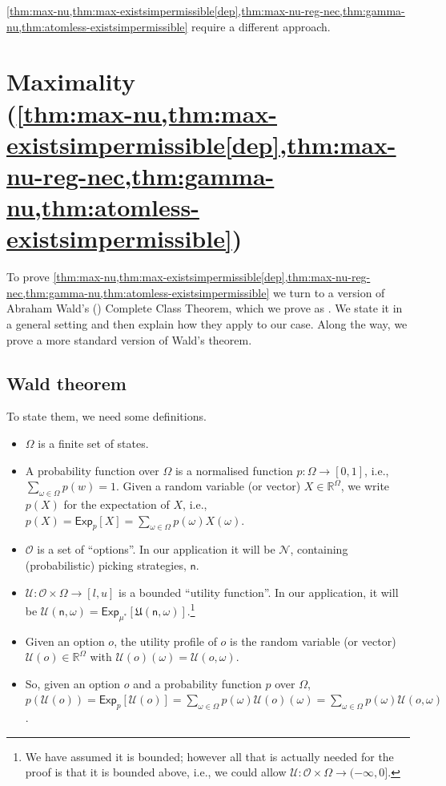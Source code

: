 \documentclass[a4paper,final]{article}
\newcommand\Exp{\mathsf{Exp}}
\renewcommand\O{\mathcal{O}}
\newcommand\U{\mathfrak{U}} %
\newcommand\Uwald{\mathcal{U}} %
\newcommand{\n}{\mathsf{n}}
\newcommand\Nu{\mathcal{N}}
\renewcommand{\Re}{\mathbb{R}}
\newenvironment{CCM rewritten}
{\begingroup\color{blue}} %
{\endgroup}              %
\begin{document}
\cref{thm:max-nu,thm:max-existsimpermissible[dep],thm:max-nu-reg-nec,thm:gamma-nu,thm:atomless-existsimpermissible} require a different approach.


\section{Maximality \\(\cref{thm:max-nu,thm:max-existsimpermissible[dep],thm:max-nu-reg-nec,thm:gamma-nu,thm:atomless-existsimpermissible})}\label{sect:wald:appendix}
To prove \cref{thm:max-nu,thm:max-existsimpermissible[dep],thm:max-nu-reg-nec,thm:gamma-nu,thm:atomless-existsimpermissible} we turn to a version of Abraham Wald's (\citeyear{wald1947cct}) Complete Class Theorem, which we prove as . %
We state it in a general setting and then explain how they apply to our case. Along the way, we prove a more standard version of Wald's theorem.
\subsection{Wald theorem}
 To state them, we need some definitions.

\begin{itemize}
	\item $\Omega$ is a finite set of states.
	\item A probability function over $\Omega$ is a normalised function $p : \Omega \to [0, 1]$, i.e., $\sum_{\omega \in \Omega} p(w) = 1$. Given a random variable (or vector) $X\in\Re^\Omega$, we write $p(X)$ for the expectation of $X$, i.e., $p(X)=\Exp_p[X] = \sum_{\omega\in\Omega}p(\omega)X(\omega)$.%
	\item $\O$ is a set of ``options''. In our application it will be $\Nu$, containing (probabilistic) picking strategies, $\n$.
	\item $\Uwald:\O\times\Omega\to [l,u]$ is a bounded ``utility function''. In our application, it will be $\Uwald(\n,\omega)=\Exp_{\mu^*}[\U(\n,\omega)]$.\footnote{We have assumed it is bounded; however all that is actually needed for the proof is that it is bounded above, i.e., we could allow $\Uwald:\O\times\Omega\to (-\infty,0]$.}
		\item Given an option $o$, the utility profile of $o$ is the random variable (or vector) $\Uwald(o) \in\Re^\Omega$ with $\Uwald(o)(\omega)=\Uwald(o,\omega)$.%
		\item So, given an option $o$ and a probability function $p$ over $\Omega$, $p(\Uwald(o)) = \Exp_p[\Uwald(o)] = \sum_{\omega \in \Omega} p(\omega) \Uwald(o)(\omega) = \sum_{\omega \in \Omega} p(\omega) \Uwald(o, \omega)$.
	\end{itemize}
\end{document}
